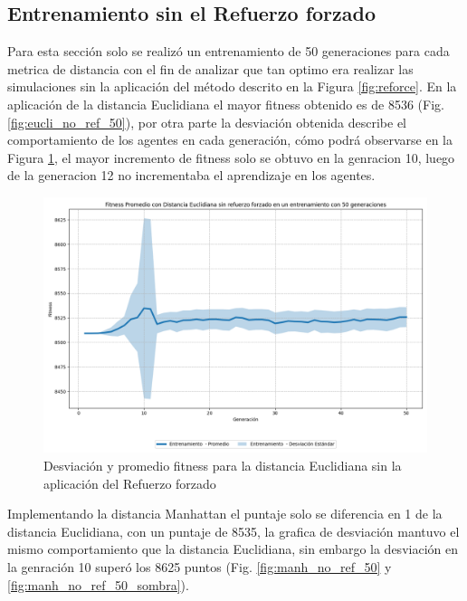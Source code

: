 \documentclass[conference]{IEEEtran}
\begin{document}
\subsection{Entrenamiento sin el Refuerzo forzado}
Para esta sección solo se realizó un entrenamiento de 50 generaciones para cada metrica de distancia con el fin de analizar que tan optimo era realizar las simulaciones sin la aplicación del método descrito en la Figura \ref{fig:reforce}.
En la aplicación de la distancia Euclidiana el mayor fitness obtenido es de 8536 (Fig. \ref{fig:eucli_no_ref_50}), por otra parte la desviación obtenida describe el comportamiento de los agentes en cada generación, cómo podrá observarse en la Figura \ref{fig:no_refoice_eucli_desv}, el mayor incremento de fitness solo se obtuvo en la genracion 10, luego de la generacion 12 no incrementaba el aprendizaje en los agentes.
\begin{figure}[H]
    \centering
    \includegraphics[width=0.8\linewidth]{Sin_Refuerzo_50Gen/Eucli_NoRef_50Gen_Sombra.png}
    \caption{Desviación y promedio fitness para la distancia Euclidiana sin la aplicación del Refuerzo forzado}
    \label{fig:no_refoice_eucli_desv}
\end{figure}

Implementando la distancia Manhattan el puntaje solo se diferencia en 1 de la distancia Euclidiana, con un puntaje de 8535, la grafica de desviación mantuvo el mismo comportamiento que la distancia Euclidiana, sin embargo la desviación en la genración 10 superó los 8625 puntos (Fig. \ref{fig:manh_no_ref_50} y \ref{fig:manh_no_ref_50_sombra}).
\end{document}
